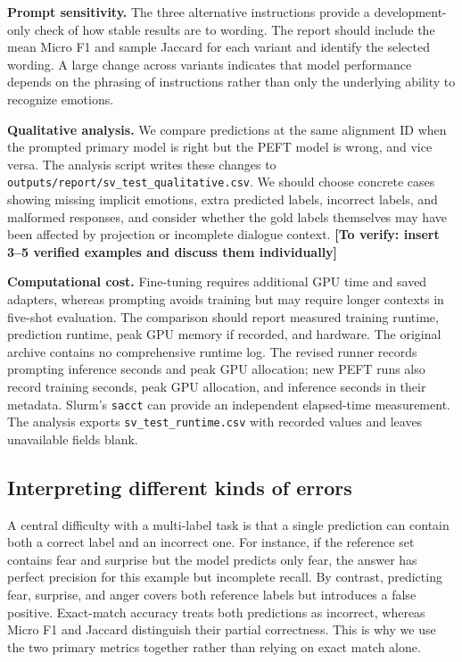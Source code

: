 \documentclass[11pt,a4paper]{article}
\newcommand{\todo}[1]{\textcolor{red!65!black}{\textbf{[To verify: #1]}}}
\begin{document}
\textbf{Prompt sensitivity.} The three alternative instructions provide a development-only check of how stable results are to wording. The report should include the mean Micro F1 and sample Jaccard for each variant and identify the selected wording. A large change across variants indicates that model performance depends on the phrasing of instructions rather than only the underlying ability to recognize emotions.

\textbf{Qualitative analysis.} We compare predictions at the same alignment ID when the prompted primary model is right but the PEFT model is wrong, and vice versa. The analysis script writes these changes to \texttt{outputs/report/sv\_test\_qualitative.csv}. We should choose concrete cases showing missing implicit emotions, extra predicted labels, incorrect labels, and malformed responses, and consider whether the gold labels themselves may have been affected by projection or incomplete dialogue context. \todo{insert 3--5 verified examples and discuss them individually}

\textbf{Computational cost.} Fine-tuning requires additional GPU time and saved adapters, whereas prompting avoids training but may require longer contexts in five-shot evaluation. The comparison should report measured training runtime, prediction runtime, peak GPU memory if recorded, and hardware. The original archive contains no comprehensive runtime log. The revised runner records prompting inference seconds and peak GPU allocation; new PEFT runs also record training seconds, peak GPU allocation, and inference seconds in their metadata. Slurm's \texttt{sacct} can provide an independent elapsed-time measurement. The analysis exports \texttt{sv\_test\_runtime.csv} with recorded values and leaves unavailable fields blank.

\subsection*{Interpreting different kinds of errors}
A central difficulty with a multi-label task is that a single prediction can contain both a correct label and an incorrect one. For instance, if the reference set contains fear and surprise but the model predicts only fear, the answer has perfect precision for this example but incomplete recall. By contrast, predicting fear, surprise, and anger covers both reference labels but introduces a false positive. Exact-match accuracy treats both predictions as incorrect, whereas Micro F1 and Jaccard distinguish their partial correctness. This is why we use the two primary metrics together rather than relying on exact match alone.
\end{document}
